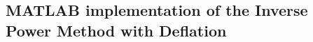\subsection{MATLAB implementation of the Inverse Power Method with Deflation} \label{matlab:inverse_power_method_deflation}
